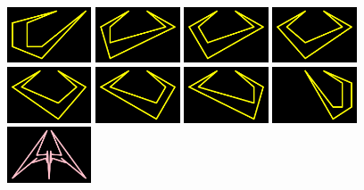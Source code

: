 \lhead[]{}
\rhead[]{}
\renewcommand{\headrulewidth}{0pt}
\ %
\vspace*{\fill}
\begin{figure}[H]
  \centering
    \includegraphics[width=2.5cm]{preface/vector_images/vec_image_curs1.png}
    \includegraphics[width=2.5cm]{preface/vector_images/vec_image_curs2.png}
    \includegraphics[width=2.5cm]{preface/vector_images/vec_image_curs3.png}
    \includegraphics[width=2.5cm]{preface/vector_images/vec_image_curs4.png}
    \includegraphics[width=2.5cm]{preface/vector_images/vec_image_curs5.png}
    \includegraphics[width=2.5cm]{preface/vector_images/vec_image_curs6.png}
    \includegraphics[width=2.5cm]{preface/vector_images/vec_image_curs7.png}
    \includegraphics[width=2.5cm]{preface/vector_images/vec_image_curs8.png}
    \includegraphics[width=2.5cm]{preface/vector_images/vec_image_ener11.png}

\end{figure}
